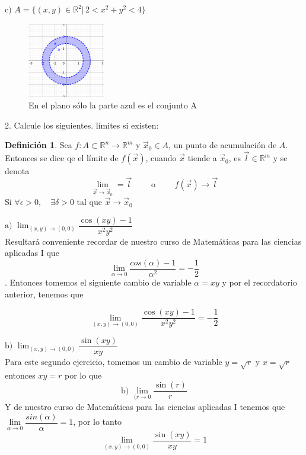 \documentclass[letterpaper]{article}
\newcommand{\R}{\mathds{R}}
\renewcommand{\*}{\cdot}
\theoremstyle{definition}
\newtheorem{definition}{Definición}
\begin{document}
%
%
\noindent$\text{c) }A = \{ (x,y) \in \mathbb{R}^2 \vert \, 2 < x^2  + y^2 < 4\}$
\begin{figure}[h]
	\centering
	\includegraphics[width=0.3\textwidth]{1c}
	\caption{En el plano sólo la parte azul es el conjunto A}
\end{figure}


2.  Calcule los siguientes. límites si existen: 
\begin{definition}
	Sea $ f: A \subset \R^n \to \R^m $ y $ \vec{x}_0 \in A $, un punto de acumulación de $ A $. Entonces se dice qe el límite de $  f(\vec{x}) $, cuando $ \vec{x} $ tiende a $ \vec{x}_0 $, es $ \vec{\textit{l}} \in \R^m $ y se denota
	\[ \lim\limits_{\vec{x} \to \vec{x}_0} = \vec{\textit{l}} \qquad \text{ o } \qquad f(\vec{x}) \to \vec{\textit{l}} \]
	Si $ \forall \epsilon > 0, \quad \exists  \delta > 0 $ tal que $ \vec{x} \to \vec{x}_0 $
\end{definition}


\noindent$\text{a) }\displaystyle\lim_{(x,y) \to (0,0)} \dfrac{\cos(xy) - 1}{x^2y^2}$\\
Resultará conveniente recordar de nuestro curso de Matemáticas para las ciencias aplicadas I que $$ \lim\limits_{\alpha \to 0} \dfrac{cos(\alpha) - 1}{\alpha^2} = -\dfrac{1}{2} $$.  
Entonces tomemos el siguiente cambio de variable $ \alpha = xy $
y por el recordatorio anterior, tenemos que 
 
$$\displaystyle\lim_{(x,y) \to (0,0)} \dfrac{\cos(xy) - 1}{x^2y^2} = -\dfrac{1}{2}$$

\noindent$\text{b) }\displaystyle\lim_{(x,y) \to (0,0)} \dfrac{\sin(xy) }{xy}$\\
Para este segundo ejercicio, tomemos un cambio de variable $ y =\sqrt{r}  $ y $ x = \sqrt{r} $ entonces $ xy = r $ por lo que
$$\text{b) }\displaystyle\lim_{(r\to 0} \dfrac{\sin(r) }{r}$$
Y de nuestro curso de Matemáticas para las ciencias aplicadas I tenemos que $ \lim\limits_{\alpha \to 0} \dfrac{sin(\alpha)}{\alpha} = 1 $, por lo tanto
$$\displaystyle\lim_{(x,y) \to (0,0)} \dfrac{\sin(xy) }{xy} = 1$$
\end{document}

